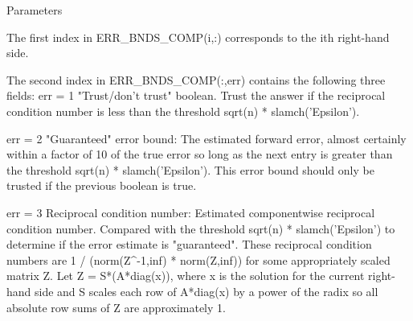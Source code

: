\begin{DoxyParams}[1]{Parameters}
\begin{DoxyVerb}
     The first index in ERR_BNDS_COMP(i,:) corresponds to the ith
     right-hand side.

     The second index in ERR_BNDS_COMP(:,err) contains the following
     three fields:
     err = 1 "Trust/don't trust" boolean. Trust the answer if the
              reciprocal condition number is less than the threshold
              sqrt(n) * slamch('Epsilon').

     err = 2 "Guaranteed" error bound: The estimated forward error,
              almost certainly within a factor of 10 of the true error
              so long as the next entry is greater than the threshold
              sqrt(n) * slamch('Epsilon'). This error bound should only
              be trusted if the previous boolean is true.

     err = 3  Reciprocal condition number: Estimated componentwise
              reciprocal condition number.  Compared with the threshold
              sqrt(n) * slamch('Epsilon') to determine if the error
              estimate is "guaranteed". These reciprocal condition
              numbers are 1 / (norm(Z^{-1},inf) * norm(Z,inf)) for some
              appropriately scaled matrix Z.
              Let Z = S*(A*diag(x)), where x is the solution for the
              current right-hand side and S scales each row of
              A*diag(x) by a power of the radix so all absolute row
              sums of Z are approximately 1.


\end{DoxyVerb}
\end{DoxyParams}
